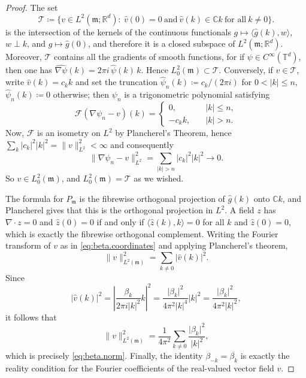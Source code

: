 \documentclass[11pt,reqno]{amsart}
\theoremstyle{plain}
\theoremstyle{definition}
\newcommand{\T}{\mathbb{T}}
\newcommand{\R}{\mathbb{R}}
\newcommand{\C}{\mathbb{C}}
\newcommand{\Leb}{\mathfrak{m}}
\begin{document}
\begin{proof}
    The set \[
        \mathcal{T} \coloneqq  \Big\{v\in L^2(\Leb;\R^d):\ \hat v(0)=0\ \text{and}\
        \hat v(k)\in\C k\ \text{for all}\ k\neq0\Big\}.
    \]
    is the intersection of the kernels of the continuous
    functionals \( g\mapsto\langle\hat g(k),w\rangle \), \( w\perp k \), and \( g\mapsto\hat g(0) \), and therefore it is a closed subspace of \(L^2(\Leb;\R^d)\).
    Moreover, \(\mathcal{T}\) contains all the gradients of smooth functions, for if \( \psi\in C^\infty(\T^d) \), then one has \( \widehat{\nabla\psi}(k)=2\pi i\,\hat\psi(k)\,k \).
    Hence \( L^2_0(\Leb) \subset \mathcal{T} \).
    Conversely, if \( v \in \mathcal{T} \), write \( \hat v(k)=c_kk \) and set the truncation \( \hat\psi_n(k)\coloneqq c_k/(2\pi i) \) for \( 0<\lvert k \rvert\le n \), \( \hat\psi_n(k)\coloneqq 0 \) otherwise; then \( \psi_n \) is a trigonometric polynomial satisfying
    \[
        \mathcal{F}{(\nabla\psi_n-v)}(k) = \begin{cases}
            0,     & \quad \lvert k \rvert \leq n, \\
            -c_kk, & \quad \lvert k \rvert > n.
        \end{cases}
    \]
    Now, \(\mathcal{F}\) is an isometry on \(L^2\) by Plancherel’s Theorem, hence \(\sum_k\lvert c_k \rvert^2\lvert k \rvert^2=\lVert v \rVert^2_{L^2}<\infty\) and consequently
    \[
        \lVert \nabla\psi_n-v \rVert^2_{L^2}=\sum_{\lvert k \rvert>n}\lvert c_k \rvert^2\lvert k \rvert^2\to0.
    \]
    So \( v\in L^2_0(\Leb) \), and \(L^2_0(\Leb) = \mathcal{T}\) as we wished.

    The formula for \( P_\Leb \) is the fibrewise orthogonal projection of \( \hat g(k) \) onto \( \C k \), and Plancherel gives that this is the orthogonal projection in \( L^2 \).
    A field \( z \) has \( \nabla\cdot z=0 \) and \( \hat z(0)=0 \) if and only if \( \langle\hat z(k),k\rangle=0 \) for all \( k \) and \( \hat z(0)=0 \), which is exactly the fibrewise orthogonal complement.
    Writing the Fourier transform of \(v\) as in \eqref{eq:beta.coordinates} and applying Plancherel's theorem,
    \[
        \lVert v \rVert_{L^2(\Leb)}^2
        =
        \sum_{k\neq0}\lvert \hat v(k) \rvert^2.
    \]
    Since
    \[
        \lvert \hat v(k) \rvert^2
        =
        \left|
        \frac{\beta_k}{2\pi i\lvert k \rvert^2}k
        \right|^2
        =
        \frac{\lvert \beta_k \rvert^2}{4\pi^2\lvert k \rvert^4}\lvert k \rvert^2
        =
        \frac{\lvert \beta_k \rvert^2}{4\pi^2\lvert k \rvert^2},
    \]
    it follows that
    \[
        \lVert v \rVert_{L^2(\Leb)}^2
        =
        \frac{1}{4\pi^2}
        \sum_{k\neq0}
        \frac{\lvert \beta_k \rvert^2}{\lvert k \rvert^2},
    \]
    which is precisely \eqref{eq:beta.norm}.
    Finally, the identity
    \( \beta_{-k}=\overline{\beta_k} \) is exactly the reality condition for the Fourier
    coefficients of the real-valued vector field \( v \).
\end{proof}
\end{document}
